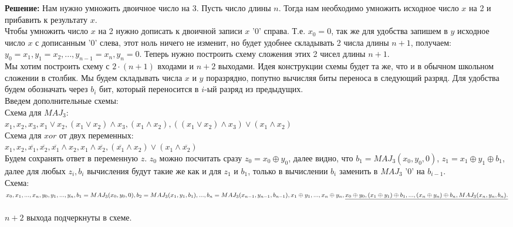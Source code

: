 \documentclass[12pt,a4paper]{scrartcl}
\begin{document}
	\textbf{Решение:} 
	\newline
	\indent
	Нам нужно умножить двоичное число на 3. Пусть число длины $n$. Тогда нам необходимо умножить исходное число $x$ на 2 и прибавить к результату $x$. \\
	Чтобы умножить число $x$ на 2 нужно дописать к двоичной записи $x$ '0' справа. Т.е. $x_0 = 0$, так же для удобства запишем в $y$ исходное число $x$ с дописанным '0' слева, этот ноль ничего не изменит, но будет удобнее складывать 2 числа длины $n + 1$, получаем:
	$y_0 = x_1, y_1 = x_2, ... , y_{n - 1} = x_n, y_n = 0$. Теперь нужно построить схему сложения этих 2 чисел длины $n + 1$. \\
	Мы хотим построить схему с $2\cdot(n + 1)$ входами и $n + 2$ выходами.
	Идея конструкции схемы будет та же, что и в обычном школьном сложении в столбик. Мы будем складывать числа $x$ и $y$ поразрядно, попутно вычисляя биты переноса в следующий разряд. Для удобства будем обозначать через $b_i$ бит, который переносится в $i$-ый разряд
	из предыдущих. \\
	Введем дополнительные схемы: \\
	\textbullet Схема для $MAJ_3$: \\
	$x_1, x_2, x_3, x_1 \lor x_2,(x_1 \lor x_2) \land x_3,(x_1 \land x_2),((x_1 \lor x_2) \land x_3) \lor (x_1 \land x_2)$ \\
	\textbullet Схема для $xor$ от двух переменных: \\
	$x_1, x_2, \overline{x_1}, \overline{x_2}, \overline{x_1} \land x_2, x_1 \land \overline{x_2}, (\overline{x_1} \land x_2) \lor (x_1 \land \overline{x_2})$ \\ 
	Будем сохранять ответ в переменную $z$. $z_0$ можно посчитать сразу $z_0 = x_0 \oplus y_0$, далее видно, что $b_1 = MAJ_3(x_0, y_0, 0)$, $z_1 = x_1 \oplus y_1 \oplus b_1$, далее для любых $z_i, b_i$ вычисления будут такие же как и для $z_1$ и $b_1$, только в вычислении $b_i$ заменить в $MAJ_3$ '0' на $b_{i - 1}$.\\
	Схема:\\
	$x_0, x_1, ... , x_n, y_0, y_1, ... , y_n, b_1 = MAJ_3(x_0, y_0, 0), b_2 = MAJ_3(x_1, y_1, b_1), ... , b_{n} = MAJ_3(x_{n - 1}, y_{n - 1}, b_{n - 1}), \\ x_1 \oplus y_1, ... , x_n \oplus y_n, \underline {x_0 \oplus y_0, (x_1 \oplus y_1) \oplus b_1, ... , (x_n \oplus y_n) \oplus b_n, MAJ_3(x_n, y_n, b_n).}$ \\
	\\
	$n + 2$ выхода подчеркнуты в схеме.
	\begin{flushright}
	\textbf{}
	\end{flushright}
\end{document}
